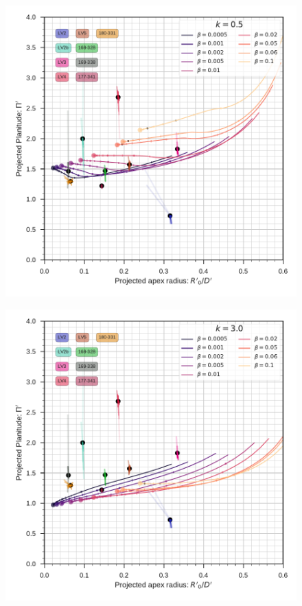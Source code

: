 \begin{figure}
  \centering
  \ContinuedFloat
  \captionsetup{list=off, format=cont}
  \includegraphics[width=0.9\linewidth]{./Figures/obs-diagnostic-Pi-R0-k05}
  \caption{}
  \label{fig:obs-diagnostic-2}
\end{figure}

\begin{figure}
  \centering
  \ContinuedFloat
  \captionsetup{list=off, format=cont}
  \includegraphics[width=0.9\linewidth]{./Figures/obs-diagnostic-Pi-R0-k30} 
  \caption{}
  \label{fig:obs-diagnostic-3}
\end{figure}


